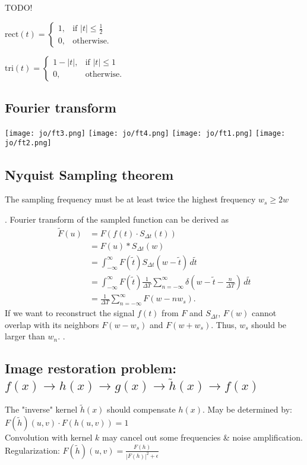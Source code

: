 TODO!

$\text{rect}(t) = \begin{cases} 1, & \text{if } |t| \leq \frac{1}{2} \\ 0, & \text{otherwise.} \end{cases}$

$\text{tri}(t) = \begin{cases} 1 - |t|, & \text{if } |t| \leq 1 \\ 0, & \text{otherwise.} \end{cases}$

\subsection*{Fourier transform}
\texttt{[image: jo/ft3.png]}
\texttt{[image: jo/ft4.png]}
\texttt{[image: jo/ft1.png]}
\texttt{[image: jo/ft2.png]}

\subsection*{Nyquist Sampling theorem}
The sampling frequency must be at least twice the highest frequency $w_s \geq 2 w$ 

 . Fourier transform of the sampled function can be derived as
\begin{align*}
    \tilde{F}(u) &= F(f(t) \cdot S_{\Delta t}(t)) \\
                 &= F(u) * S_{\Delta t}(w) \\
                 &= \int_{-\infty}^{\infty} F(\tilde{t}) S_{\Delta t}(w - \tilde{t}) \, d\tilde{t} \\
                 &= \int_{-\infty}^{\infty} F(\tilde{t}) \frac{1}{\Delta T} \sum_{n = -\infty}^{\infty} \delta (w - \tilde{t} - \frac{n}{\Delta T}) \, d\tilde{t} \\
                 &= \frac{1}{\Delta T} \sum_{n = -\infty}^{\infty} F(w - n w_s).
\end{align*}
If we want to reconstruct the signal $f(t)$ from $F$ and $S_{\Delta t}$, $F(w)$ cannot overlap with its neighbors $F(w - w_s)$ and $F(w + w_s)$. Thus, $w_s$ should be larger than $w_n$. .
\subsection*{Image restoration problem: $f(x) \rightarrow h(x) \rightarrow g(x) \rightarrow \tilde{h}(x) \rightarrow f(x)$}
The "inverse" kernel $\tilde{h}(x)$ should compensate $h(x)$. May be determined by: $F(\tilde{h})(u, v) \cdot F(h(u, v)) = 1$\\
 Convolution with kernel $k$ may cancel out some frequencies \& noise amplification. \\
 Regularization: $F(\tilde{h})(u, v) = \frac{F(h)}{{|F(h)|}^{2} + \epsilon}$ 
